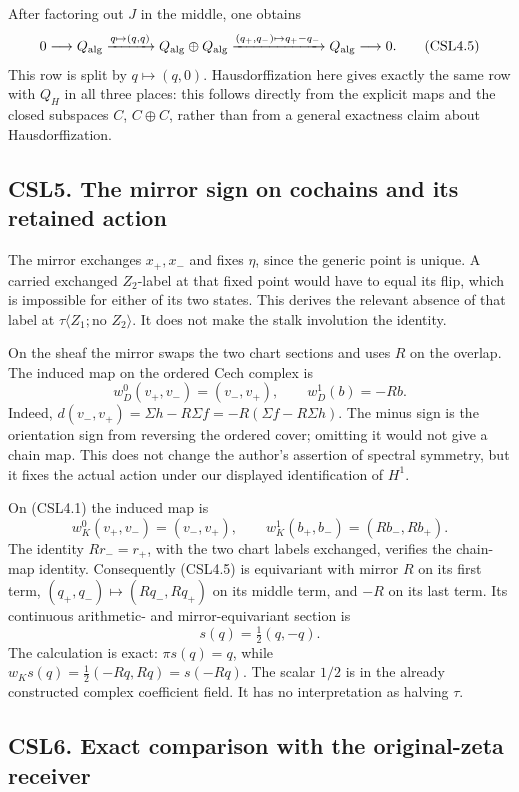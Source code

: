 After factoring out \(J\) in the middle, one obtains \[
0\longrightarrow Q_{\rm alg}\xrightarrow{q\mapsto(q,q)}
Q_{\rm alg}\oplus Q_{\rm alg}
\xrightarrow{(q_+,q_-)\mapsto q_+-q_-}Q_{\rm alg}
\longrightarrow0.
\tag{CSL4.5}
\] This row is split by \(q\mapsto(q,0)\). Hausdorffization here gives
exactly the same row with \(Q_H\) in all three places: this follows
directly from the explicit maps and the closed subspaces \(C\),
\(C\oplus C\), rather than from a general exactness claim about
Hausdorffization.

\subsection{CSL5. The mirror sign on cochains and its retained
action}\label{csl5.-the-mirror-sign-on-cochains-and-its-retained-action}

The mirror exchanges \(x_+,x_-\) and fixes \(\eta\), since the generic
point is unique. A carried exchanged \(Z_2\)-label at that fixed point
would have to equal its flip, which is impossible for either of its two
states. This derives the relevant absence of that label at
\(\tau\langle Z_1;\text{no }Z_2\rangle\). It does not make the stalk
involution the identity.

On the sheaf the mirror swaps the two chart sections and uses \(R\) on
the overlap. The induced map on the ordered Cech complex is \[
w_D^0(v_+,v_-)=(v_-,v_+),\qquad w_D^1(b)=-Rb.
\tag{CSL5.1}
\] Indeed, \(d(v_-,v_+)=\Sigma h-R\Sigma f=-R(\Sigma f-R\Sigma h)\). The
minus sign is the orientation sign from reversing the ordered cover;
omitting it would not give a chain map. This does not change the
author's assertion of spectral symmetry, but it fixes the actual action
under our displayed identification of \(H^1\).

On (CSL4.1) the induced map is \[
w_K^0(v_+,v_-)=(v_-,v_+),\qquad
w_K^1(b_+,b_-)=(Rb_-,Rb_+).
\tag{CSL5.2}
\] The identity \(Rr_-=r_+\), with the two chart labels exchanged,
verifies the chain-map identity. Consequently (CSL4.5) is equivariant
with mirror \(R\) on its first term, \((q_+,q_-)\mapsto(Rq_-,Rq_+)\) on
its middle term, and \(-R\) on its last term. Its continuous arithmetic-
and mirror-equivariant section is \[
s(q)=\tfrac12(q,-q).
\tag{CSL5.3}
\] The calculation is exact: \(\pi s(q)=q\), while
\(w_Ks(q)=\tfrac12(-Rq,Rq)=s(-Rq)\). The scalar \(1/2\) is in the
already constructed complex coefficient field. It has no interpretation
as halving \(\tau\).

\subsection{CSL6. Exact comparison with the original-zeta
receiver}\label{csl6.-exact-comparison-with-the-original-zeta-receiver}

